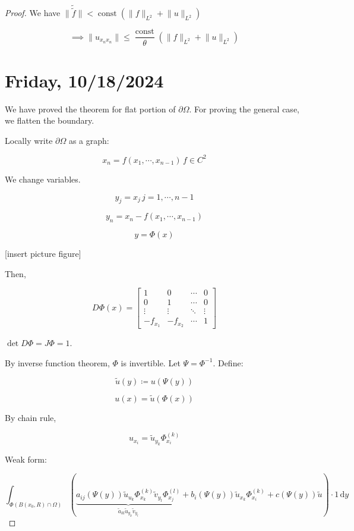 \documentclass{article}
\theoremstyle{definition}
\begin{document}
\begin{proof}
    We have \(\lVert \tilde{\tilde{f}} \rVert < \operatorname{const}(\lVert f \rVert _{L^2} + \lVert u \rVert _{L^2})\) 

    \[
        \implies \lVert u_{x_n x_n}  \rVert \leq \frac{\operatorname{const}}{\theta} \left( \lVert f \rVert _{L^2} + \lVert u \rVert _{L^2} \right) 
    \]

    \section*{Friday, 10/18/2024}
    

    We have proved the theorem for flat portion of \(\partial \Omega\). For proving the general case, we flatten the boundary.

    Locally write \(\partial \Omega\) as a graph:

    \[
        x_n = f(x_1, \cdots , x_{n-1}) \, f \in C^2
    \]

    We change variables.

    \[
        y_j = x_j \, j = 1, \cdots , n-1
    \]

    \[
        y_n = x_n - f(x_1, \cdots , x_{n-1})
    \]

    \[
        y = \Phi(x)
    \]

    [insert picture figure]

    Then,

    \[
        D \Phi (x) = \begin{bmatrix}
            1 & 0 & \cdots &  0 \\
            0 & 1 & \cdots &  0 \\
            \vdots & \vdots & \ddots  &  \vdots \\
            - f_{x_1} & -f_{x_2} & \cdots & 1
        \end{bmatrix}
    \]

    \(\det D \Phi = J \Phi = 1\).

    By inverse function theorem, \(\Phi\) is invertible. Let \(\Psi = \Phi ^{-1}\). Define:

    \[
        \widetilde{u} (y) \coloneqq u(\Psi(y))
    \]

    \[
        u(x) = \widetilde{u}(\Phi(x))
    \]

    By chain rule,

    \[
        u_{x_i} = \widetilde{u}_{y_k} \Phi_{x_i} ^{(k)}
    \]

    Weak form:

    \[
        \int_{\Phi(B(x_0,R)\cap \Omega)} \left(\underbrace{a_{ij} (\Psi(y))\widetilde{u}_{u_k} \Phi_{x_k} ^{(k)} \widetilde{v}_{y_l} \Phi_{x_j}^{(l)}}_{\widetilde{a}_{kl} \widetilde{u}_{y_k} \widetilde{v}_{y_l} } + b_i (\Psi(y))\widetilde{u}_{x_k} \Phi^{(k)}_{x_i} + c(\Psi(y)) \widetilde{u}  \right) \cdot 1  \,\mathrm{d}y 
    \]


\end{proof}
\end{document}
